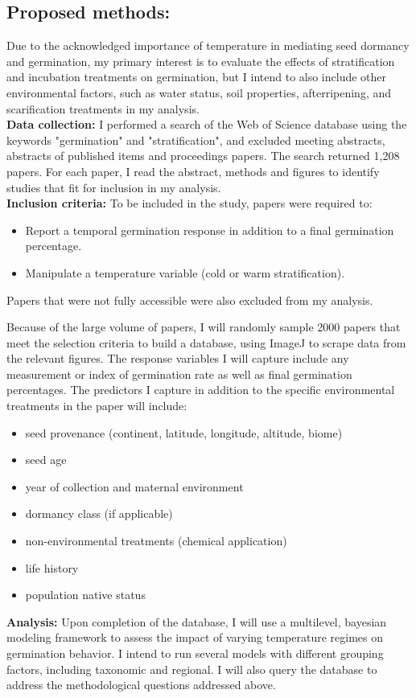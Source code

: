 \documentclass{article}\usepackage[]{graphicx}\usepackage[]{color}
\begin{document}
\subsection*{Proposed methods:}
\indent\indent Due to the acknowledged importance of temperature in mediating seed dormancy and germination, my primary interest is to evaluate the effects of stratification and incubation treatments on germination, but I intend to also include other environmental factors, such as water status, soil properties, afterripening, and scarification treatments in my analysis.\\
\indent\textbf{Data collection:} I performed a search of the Web of Science database using the keywords "germination" and "stratification", and excluded meeting abstracts, abstracts of published items and proceedings papers. The search returned 1,208 papers. For each paper, I read the abstract, methods and figures to identify studies that fit for inclusion in my analysis.\\
\indent\textbf{Inclusion criteria:} To be included in the study, papers were required to:
\begin{itemize}
\item Report a temporal germination response in addition to a final germination percentage.
\item Manipulate a temperature variable (cold or warm stratification).
\end{itemize}
Papers that were not fully accessible were also excluded from my analysis. 
\par Because of the large volume of papers, I will randomly sample 2000 papers that meet the selection criteria to build a database, using ImageJ to scrape data from the relevant figures. The response variables I will capture include any measurement or index of germination rate as well as final germination percentages. The predictors I capture in addition to the specific environmental treatments in the paper will include:
\begin{itemize}
\item seed provenance (continent, latitude, longitude, altitude, biome)
\item seed age
\item year of collection and maternal environment
\item dormancy class (if applicable)
\item non-environmental treatments (chemical application)
\item life history
\item population native status
\end{itemize}
\indent\indent\textbf{Analysis:} Upon completion of the database, I will use a multilevel, bayesian modeling framework to assess the impact of varying temperature regimes on germination behavior. I intend to run several models with different grouping factors, including taxonomic and regional. I will also query the database to address the methodological questions addressed above.
\end{document}
